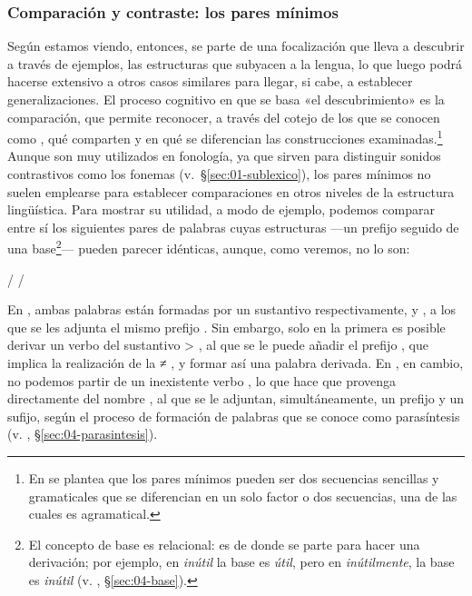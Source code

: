 \subsubsection{Comparación y contraste: los pares mínimos}\label{sec:01-paresminimos}

Según estamos viendo, entonces, se parte de una focalización que lleva a
descubrir a través de ejemplos, las estructuras que subyacen a la lengua, lo
que luego podrá hacerse extensivo a otros casos similares para llegar, si cabe,
a establecer generalizaciones. El proceso cognitivo en que se basa «el
descubrimiento» es la comparación, que permite reconocer, a través del cotejo
de los que se conocen como 
\parencite{bosque2016,brucart2018}, qué comparten y en qué se diferencian las
construcciones examinadas.\footnote{En \textcite{bosque2016} se plantea que los
pares mínimos pueden ser dos secuencias sencillas y gramaticales que se
diferencian en un solo factor o dos secuencias, una de las cuales es
agramatical.} Aunque son muy utilizados en fonología, ya que sirven para
distinguir sonidos contrastivos como los fonemas
(v.~§\ref{sec:01-sublexico}), los pares mínimos no suelen emplearse para
establecer comparaciones en otros niveles de la estructura lingüística. Para
mostrar su utilidad, a modo de ejemplo, podemos comparar entre sí los
siguientes pares de palabras cuyas estructuras ---un prefijo seguido de una
base\footnote{El concepto de base es relacional: es de donde se parte para
hacer una derivación; por ejemplo, en \textit{inútil} la base es \textit{útil},
pero en \textit{inútilmente}, la base es \textit{inútil} (v. ,
§\ref{sec:04-base}).}--- pueden parecer idénticas, aunque, como veremos, no lo son:

\begin{exe}
  \ex\label{ex:01-despistar}  / 
  \ex\label{ex:01-autopista}  / 
\end{exe}

En , ambas palabras están formadas por un sustantivo
respectivamente,  y , a los que se les adjunta el
mismo prefijo . Sin embargo, solo en la primera es posible derivar
un verbo del sustantivo  > , al que se le puede
añadir el prefijo , que implica la realización de la   ≠ , y formar así una palabra
derivada. En , en cambio, no podemos partir de un inexistente
verbo , lo que hace que  provenga
directamente del nombre , al que se le adjuntan, simultáneamente,
un prefijo y un sufijo, según el proceso de formación de palabras que se conoce
como parasíntesis (v. , §\ref{sec:04-parasintesis}).

